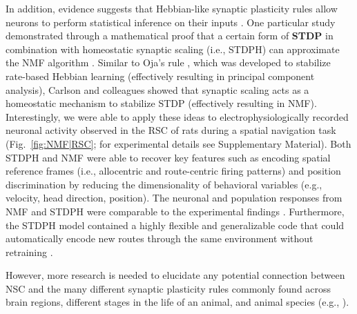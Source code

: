 In addition, evidence suggests that Hebbian-like synaptic plasticity rules
allow neurons to perform statistical inference on their inputs
\cite{Nessler2009,Carlson2013,MorenoBoteDrugowitsch2015,Oja1982}.
One particular study demonstrated through a mathematical proof
that a certain form of \textbf{\ac{STDP}} in combination with 
homeostatic synaptic scaling (i.e., \ac{STDPH})
can approximate the \ac{NMF} algorithm
\cite{Carlson2013}.
Similar to Oja's rule \cite{Oja1982}, which was developed to stabilize 
rate-based Hebbian learning
(effectively resulting in principal component analysis),
Carlson and colleagues showed that synaptic scaling acts as a 
homeostatic mechanism to stabilize \ac{STDP}
(effectively resulting in \ac{NMF}).
Interestingly, we were able to apply these ideas to 
electrophysiologically recorded neuronal activity observed in the \ac{RSC}
of rats during a spatial navigation task (Fig.~\ref{fig:NMF|RSC}; for experimental details see Supplementary Material). Both \ac{STDPH} and \ac{NMF} were able to recover key  features such as encoding spatial reference frames (i.e., allocentric and route-centric firing patterns) and position discrimination by reducing the dimensionality of behavioral variables (e.g., velocity, head direction, position).
The neuronal and population responses from NMF and STDPH were comparable to the experimental findings \cite{AlexanderNitz2015}.
Furthermore, the \ac{STDPH} model contained a highly flexible and generalizable code
that could automatically encode new routes through the same environment
without retraining \cite{Rounds2018}.

However, more research is needed to elucidate any potential connection 
between \ac{NSC} and the many different synaptic plasticity rules 
commonly found across brain regions,
different stages in the life of an animal, and animal species
(e.g., \cite{Froemke2010,BCM1982}).


